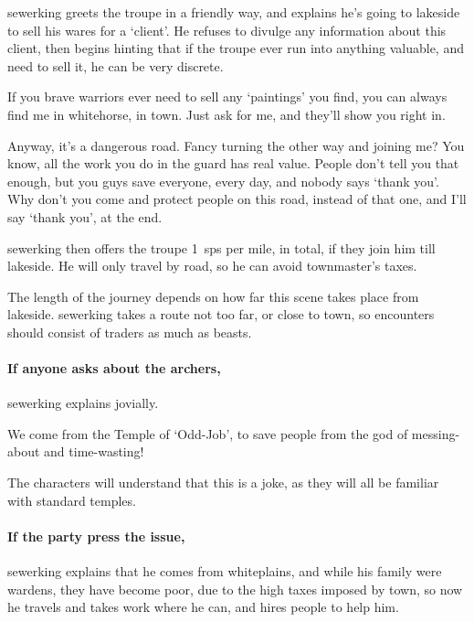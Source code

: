 \setcounter{wounds}{2}

\sewerking


\Gls{sewerking} greets the troupe in a friendly way, and explains he's going to \gls{lakeside} to sell his wares for a `client'.
He refuses to divulge any information about this client, then begins hinting that if the troupe ever run into anything valuable, and need to sell it, he can be very discrete.

\begin{speechtext}
  If you brave warriors ever need to sell any `paintings' you find, you can always find me in \gls{whitehorse}, in \gls{town}.
  Just ask for me, and they'll show you right in.

  Anyway, it's a dangerous road.
  Fancy turning the other way and joining me?
  You know, all the work you do in the \gls{guard} has real value.
  People don't tell you that enough, but you guys save everyone, every day, and nobody says `thank you'.
  Why don't you come and protect people on this road, instead of that one, and I'll say `thank you', at the end.
\end{speechtext}

\Gls{sewerking} then offers the troupe 1~\glspl{sp} per mile, in total, if they join him till \gls{lakeside}.
He will only travel by road, so he can avoid \gls{townmaster}'s taxes.

The length of the journey depends on how far this scene takes place from \gls{lakeside}.
\Gls{sewerking} takes a route not too far, or close to town, so encounters should consist of traders as much as beasts.

\paragraph{If anyone asks about the archers,}
\gls{sewerking} explains jovially.

\begin{speechtext}
  We come from the Temple of `Odd-Job', to save people from the god of messing-about and time-wasting!%
\end{speechtext}

The characters will understand that this is a joke, as they will all be familiar with standard temples.

\paragraph{If the party press the issue,}
\gls{sewerking} explains that he comes from \gls{whiteplains}, and while his family were \glspl{warden}, they have become poor, due to the high taxes imposed by \gls{town}, so now he travels and takes work where he can, and hires people to help him.


